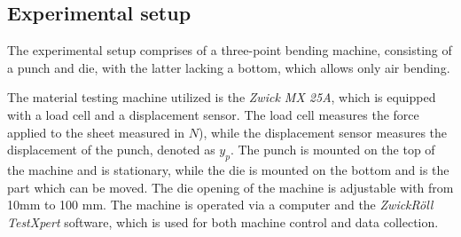 
%
%

\subsection{Experimental setup}\label{subsec:experimental-setup}
The experimental setup comprises of a three-point bending machine, consisting
of a punch and die, with the latter lacking a bottom, which allows only air bending.

The material testing machine utilized is the \textit{Zwick MX 25A}, which is
equipped with a load cell and a displacement sensor.
The load cell measures the force applied to the sheet measured in $N$), while the
displacement sensor measures the displacement of the punch, denoted as $y_p$.
The punch is mounted on the top of the machine and is stationary, while the
die is mounted on the bottom and is the part which can be moved.
The die opening of the machine is adjustable with from 10mm to 100 mm.
The machine is operated via a computer and the \textit{ZwickRöll TestXpert} software,
which is used for both machine control and data collection.

